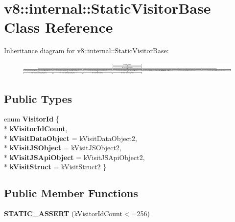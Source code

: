 \hypertarget{classv8_1_1internal_1_1_static_visitor_base}{}\section{v8\+:\+:internal\+:\+:Static\+Visitor\+Base Class Reference}
\label{classv8_1_1internal_1_1_static_visitor_base}
Inheritance diagram for v8\+:\+:internal\+:\+:Static\+Visitor\+Base\+:\begin{figure}[H]
\begin{center}
\leavevmode
\includegraphics[height=0.679406cm]{classv8_1_1internal_1_1_static_visitor_base}
\end{center}
\end{figure}
\subsection*{Public Types}
\begin{DoxyCompactItemize}
\item 
enum {\bfseries Visitor\+Id} \{ \\*
{\bfseries k\+Visitor\+Id\+Count}, 
\\*
{\bfseries k\+Visit\+Data\+Object} = k\+Visit\+Data\+Object2, 
\\*
{\bfseries k\+Visit\+J\+S\+Object} = k\+Visit\+J\+S\+Object2, 
\\*
{\bfseries k\+Visit\+J\+S\+Api\+Object} = k\+Visit\+J\+S\+Api\+Object2, 
\\*
{\bfseries k\+Visit\+Struct} = k\+Visit\+Struct2
 \}\hypertarget{classv8_1_1internal_1_1_static_visitor_base_af9775afeed7cf59c206dc27e150d407b}{}\label{classv8_1_1internal_1_1_static_visitor_base_af9775afeed7cf59c206dc27e150d407b}

\end{DoxyCompactItemize}
\subsection*{Public Member Functions}
\begin{DoxyCompactItemize}
\item 
{\bfseries S\+T\+A\+T\+I\+C\+\_\+\+A\+S\+S\+E\+RT} (k\+Visitor\+Id\+Count$<$=256)\hypertarget{classv8_1_1internal_1_1_static_visitor_base_a64789728e26d8c8114f269a757f4e472}{}\label{classv8_1_1internal_1_1_static_visitor_base_a64789728e26d8c8114f269a757f4e472}

\end{DoxyCompactItemize}
